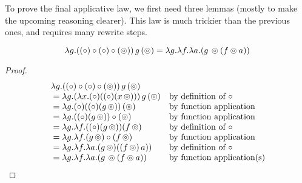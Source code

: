
To prove the final applicative law, we first need three lemmas (mostly to make the upcoming reasoning clearer). This law is much trickier than the previous ones, and requires many rewrite steps.

\begin{lemma}
$$
\lambda g . ((\circ) \circ (\circ) \circ (\circledcirc))\, g\, (\circledcirc) = \lambda g . \lambda f . \lambda a . (g\, \circledcirc (f \circledcirc a))
$$
\end{lemma}
\begin{proof}
$$
\begin{array}{ll}
\lambda g . ((\circ) \circ (\circ) \circ (\circledcirc))\, g\, (\circledcirc) \\
{}= \lambda g . (\lambda x . (\circ) ((\circ) (x\, \circledcirc)))\, g\, (\circledcirc)
 &\mbox{by definition of }\circ\\
{}= \lambda g . (\circ) ((\circ) (g\, \circledcirc))\, (\circledcirc) 
& \mbox{by function application}\\
{}= \lambda g . ((\circ) (g\, \circledcirc)) \circ (\circledcirc) 
& \mbox{by function application}\\
{}= \lambda g . \lambda f . ((\circ) (g\, \circledcirc)) (f\, \circledcirc) 
 &\mbox{by definition of }\circ\\
{}= \lambda g . \lambda f . (g\, \circledcirc) \circ (f\, \circledcirc)
& \mbox{by function application}\\
{}= \lambda g . \lambda f . \lambda a . (g\, \circledcirc) ((f\, \circledcirc)\, a) ) 
& \mbox{by definition of }\circ\\
{}= \lambda g . \lambda f . \lambda a . (g\, \circledcirc (f \circledcirc a))
& \mbox{by function application(s)}\\
\end{array}
$$
\end{proof}

